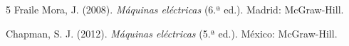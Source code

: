 \documentclass[../main]{subfiles}
\begin{document}
\begin{thebibliography}{5}
  Fraile Mora, J. (2008).
  \textit{Máquinas eléctricas} (6.ª ed.). Madrid: McGraw-Hill.

  Chapman, S. J. (2012).
  \textit{Máquinas eléctricas} (5.ª ed.). México: McGraw-Hill.
\end{thebibliography}
\end{document}

